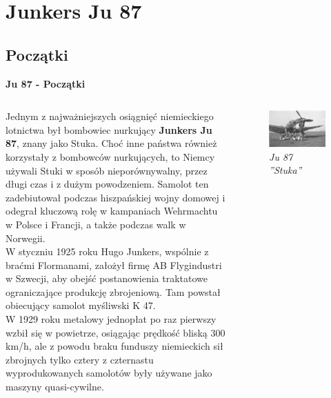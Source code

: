 \section{\large{\textbf{Junkers Ju 87}}}

\subsection{Początki}


\begin{frame}{\Huge{\textbf{Ju 87 - Początki}}}
	\begin{columns}[t]
			\justifying
			
Jednym z najważniejszych osiągnięć niemieckiego lotnictwa był bombowiec nurkujący \textbf{Junkers Ju 87}, znany jako Stuka. Choć inne państwa również korzystały z bombowców nurkujących, to Niemcy używali Stuki w sposób nieporównywalny, przez długi czas i z dużym powodzeniem. Samolot ten zadebiutował podczas hiszpańskiej wojny domowej i odegrał kluczową rolę w kampaniach Wehrmachtu w Polsce i Francji, a także podczas walk w Norwegii. \\
W styczniu 1925 roku Hugo Junkers, wspólnie z braćmi Flormanami, założył firmę AB Flygindustri w Szwecji, aby obejść postanowienia traktatowe ograniczające produkcję zbrojeniową. Tam powstał obiecujący samolot myśliwski K 47. \\
W 1929 roku metalowy jednopłat po raz pierwszy wzbił się w powietrze, osiągając prędkość bliską 300 km/h, ale z powodu braku funduszy niemieckich sił zbrojnych tylko cztery z czternastu wyprodukowanych samolotów były używane jako maszyny quasi-cywilne.

			\begin{figure}
				\centering
				\includegraphics[scale=1.9]{images/ju87-01.jpg}	
				\caption{\textit{Ju 87 ''Stuka''}}
			\end{figure}

	\end{columns}
\end{frame}


